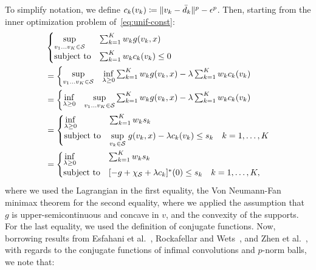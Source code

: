 \documentclass[12pt]{article}
\theoremstyle{thmstyleone}%
\theoremstyle{thmstyletwo}%
\theoremstyle{thmstylethree}%
\begin{document}
\begin{appendices}
To simplify notation, we define $c_k(v_k) \coloneqq   \| v_k - \bar{d}_k \|^p - \epsilon^p$. Then, starting from the inner optimization problem of~\eqref{eq:unif-const}:
\begin{equation*}
	\begin{aligned}
& \begin{cases}
	\underset{v_1 \dots v_K \in \mathcal{S}}{\sup} &\sum_{k=1} ^K w_k g(v_k, x) \\
	\mbox{subject to} & \sum_{k=1} ^K w_k c_k(v_k) \le 0
\end{cases}\\
&= \begin{cases}
	\underset{v_1 \dots v_K\in \mathcal{S}}{\sup}  & \underset{\lambda \geq 0}{\inf}   \sum_{k=1} ^K  w_k g(v_k, x)  - \lambda \sum_{k=1} ^K w_k c_k (v_k)\\
	\end{cases}\\
	&= \begin{cases}
		\underset{\lambda \geq 0}{\inf} & \underset{v_1 \dots v_K\in \mathcal{S}}{\sup}    \sum_{k=1} ^K  w_k  g(v_k, x)  - \lambda \sum_{k=1} ^K w_k c_k (v_k)\\
		\end{cases}\\
&= \begin{cases}
	\underset{\lambda \geq 0}{\inf} &  \sum_{k=1} ^K  w_k s_k \\
	\mbox{subject to} &  \underset{v_k\in \mathcal{S}}{\sup}\hspace{1mm} g(v_k, x) -\lambda c_k (v_k)  \le s_k \quad k = 1,\dots,K
\end{cases}\\
&= \begin{cases}
	\underset{\lambda \geq 0}{\inf} &  \sum_{k=1} ^K  w_k s_k \\
	\mbox{subject to} &  [-g +\chi_{\mathcal{S}} + \lambda c_k]^*(0)  \le s_k \quad k = 1,\dots,K,
\end{cases}\\
\end{aligned}
\end{equation*}
where we used the Lagrangian in the first equality, the Von Neumann-Fan minimax theorem for the second equality, where we applied the assumption that $g$ is upper-semicontinuous and concave in $v$, and the convexity of the supports. For the last equality, we used the definition of conjugate functions. Now, borrowing results from Esfahani et al.~\cite[Theorem 4.2]{mohajerin_esfahani_data-driven_2018}, Rockafellar and Wets~\cite[Theorem 11.23(a), p. 493]{rockafellar_wets_1998}, and Zhen et al.~\cite[Lemma B.8]{zhen2021mathematical}, with regards to the conjugate functions of infimal convolutions and $p$-norm balls, we note that:

\end{appendices}
\end{document}
